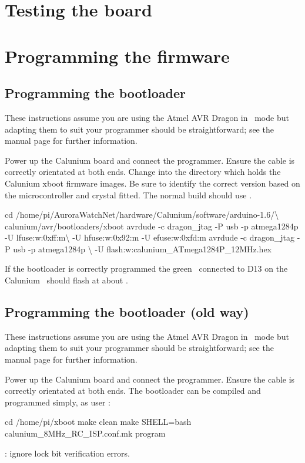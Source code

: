 \section{Testing the board}

\section{Programming the firmware}

\subsection{Programming the bootloader}

These instructions assume you are using the Atmel AVR Dragon in \jtag\
mode but adapting them to suit your programmer should be
straightforward; see the  manual page for further
information.

Power up the Calunium board and connect the programmer. Ensure the
cable is correctly orientated at both ends. Change into the directory
which holds the Calunium xboot firmware images. Be sure to identify
the correct version based on the microcontroller and crystal
fitted. The normal build should use
.

\begin{Cmd}
cd /home/pi/AuroraWatchNet/hardware/Calunium/software/arduino-1.6/\textbackslash 
    calunium/avr/bootloaders/xboot
avrdude -c dragon_jtag -P usb -p atmega1284p -U lfuse:w:0xff:m\textbackslash
    -U hfuse:w:0x92:m -U efuse:w:0xfd:m
avrdude -c dragon_jtag -P usb -p atmega1284p \textbackslash
    -U flash:w:calunium_ATmega1284P_12MHz.hex
\end{Cmd}

If the bootloader is correctly programmed the green \led\ connected to
D13 on the Calunium \pcb\ should flash at about \Hz{1}.

\subsection{Programming the bootloader (old way)}

These instructions assume you are using the Atmel AVR Dragon in \isp\
mode but adapting them to suit your programmer should be
straightforward; see the \filename{avrdude} manual page for further
information.

Power up the Calunium board and connect the programmer. Ensure the
cable is correctly orientated at both ends. The bootloader can be
compiled and programmed simply, as user \piUser: \todo[Check directory]
\begin{Cmd}
cd /home/pi/xboot
make clean
make SHELL=bash calunium_8MHz_RC_ISP.conf.mk program
\end{Cmd}
\todo: ignore lock bit verification errors.

